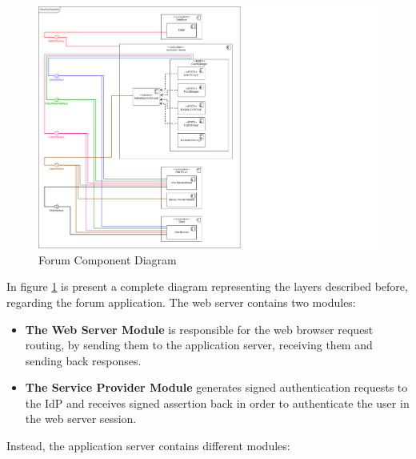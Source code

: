 \begin{figure}[h!]
        \centering
        \includegraphics[scale=0.40]{images/component_diagrams/forum_component_diagram.png}
        \caption{Forum Component Diagram}
        \label{fig:forum_component_diagram}
\end{figure}
\FloatBarrier
In figure \ref{fig:forum_component_diagram} is present a complete diagram representing the layers described before, regarding the forum application.
The web server contains two modules:
\begin{itemize}
    \item \textbf{The Web Server Module} is responsible for the web browser request routing, by sending them to the application server, receiving them and sending back responses.
    \item \textbf{The Service Provider Module} generates signed authentication requests to the IdP and receives signed assertion back in order to authenticate the user in the web server session.
\end{itemize}
Instead, the application server contains different modules:
